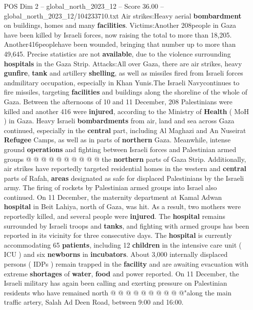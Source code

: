 \begin{textsample}{POS Dim 2 – global\_north\_2023\_12 – Score 36.00 – global\_north\_2023\_12/104233710.txt}  \label{ex:f2_pos_113}
Air strikes:Heavy aerial \textbf{bombardment} on buildings, homes and many \textbf{facilities}.
Victims:Another 208people in Gaza have been killed by Israeli forces, now raising the total to more than 18,205.
Another416peoplehave been wounded, bringing that number up to more than 49,645.
Precise statistics are not \textbf{available}, due to the violence surrounding \textbf{hospitals} in the Gaza Strip.
Attacks:All over Gaza, there are air strikes, heavy \textbf{gunfire}, \textbf{tank} and artillery \textbf{shelling}, as well as missiles fired from Israeli forces andmilitary occupation, especially in Khan Yunis.The Israeli Navycontinues to fire missiles, targeting \textbf{facilities} and buildings along the shoreline of the whole of Gaza.
Between the afternoons of 10 and 11 December, 208 Palestinians were killed and another 416 were \textbf{injured}, according to the Ministry of \textbf{Health} ( MoH ) in Gaza.
Heavy Israeli \textbf{bombardments} from air, land and sea across Gaza continued, especially in the \textbf{central} part, including Al Maghazi and An Nuseirat \textbf{Refugee} Camps, as well as in parts of \textbf{northern} Gaza.
Meanwhile, intense ground \textbf{operations} and fighting between Israeli forces and Palestinian armed groups @ @ @ @ @ @ @ @ @ @ the \textbf{northern} parts of Gaza Strip.
Additionally, air strikes have reportedly targeted residential homes in the western and \textbf{central} parts of Rafah, \textbf{areas} designated as safe for displaced Palestinians by the Israeli army.
The firing of rockets by Palestinian armed groups into Israel also continued.
On 11 December, the maternity department at Kamal Adwan \textbf{hospital} in Beit Lahiya, north of Gaza, was hit.
As a result, two mothers were reportedly killed, and several people were \textbf{injured}.
The \textbf{hospital} remains surrounded by Israeli troops and \textbf{tanks}, and fighting with armed groups has been reported in its vicinity for three consecutive days.
The \textbf{hospital} is currently accommodating 65 \textbf{patients}, including 12 \textbf{children} in the intensive care unit ( ICU ) and six \textbf{newborns} in \textbf{incubators}.
About 3,000 internally displaced persons ( IDPs ) remain trapped in the \textbf{facility} and are awaiting evacuation with extreme \textbf{shortages} of \textbf{water}, \textbf{food} and power reported.
On 11 December, the Israeli military has again been calling and exerting pressure on Palestinian residents who have remained north @ @ @ @ @ @ @ @ @ @"along the main traffic artery, Salah Ad Deen Road, between 9:00 and 16:00.

\end{textsample}
